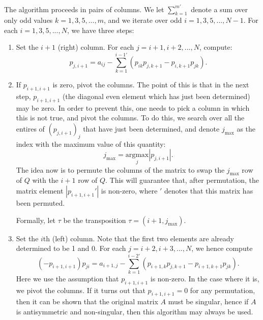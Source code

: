 The algorithm proceeds in pairs of columns. We let $\sum_{k = 1}^{m\prime}$ denote a sum over only odd values $k = 1, 3, 5, ..., m$, and we iterate over odd $i = 1, 3, 5, ..., N - 1$. For each $i = 1, 3, 5, ..., N$, we have three steps:
\begin{enumerate}
	\item Set the $i + 1$ (right) column. For each $j = i + 1, i + 2, ..., N$, compute:
	\begin{equation}
		p_{j, i + 1} = a_{ij} - \sum_{k = 1}^{i-1 \prime} \left(p_{ik} p_{j, k + 1} - p_{i, k + 1} p_{jk}\right).
	\end{equation}
	
	\item If $p_{i+1, i+1}$ is zero, pivot the columns. The point of this is that in the next step, $p_{i + 1, i + 1}$ (the diagonal even element which has just been determined) may be zero. In order to prevent this, one needs to pick a column in which this is not true, and pivot the columns. To do this, we search over all the entires of $(p_{j, i+1})_j$ that have just been determined, and denote $j_\mathrm{max}$ as the index with the maximum value of this quantity:
	\begin{equation}
		j_\mathrm{max} = \underset{j}{\mathrm{argmax}} |p_{j, i+1}|.
	\end{equation}
	The idea now is to permute the columns of the matrix to swap the $j_\mathrm{max}$ row of $Q$ with the $i+1$ row of $Q$. This will guarantee that, after permutation, the matrix element $|p_{i+1,i+1}'|$ is non-zero, where $'$ denotes that this matrix has been permuted.
	
	Formally, let $\tau$ be the transposition $\tau = (i+1, j_\mathrm{max})$. 
	
	\item Set the $i$th (left) column. Note that the first two elements are already determined to be 1 and 0. For each $j = i + 2, i + 3, ..., N$, we hence compute
	\begin{equation}
		(-p_{i+1, i+1}) p_{ji} = a_{i+1, j} - \sum_{k = 1}^{i-2\prime} \left( p_{i+1, k} p_{j, k + 1} - p_{i + 1, k + 1} p_{jk} \right).
	\end{equation}
	Here we use the assumption that $p_{i+1,i+1}$ is non-zero. In the case where it is, we pivot the columns. If it turns out that $p_{i+1,i+1} = 0$ for any permutation, then it can be shown that the original matrix $A$ must be singular, hence if $A$ is antisymmetric and non-singular, then this algorithm may always be used. 
\end{enumerate}
